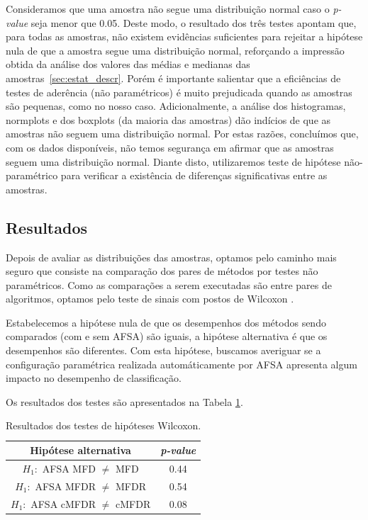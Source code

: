 \documentclass[conference]{IEEEtran}
\begin{document}
Consideramos que uma amostra não segue uma distribuição normal caso o \textit{p-value} seja menor que 0.05.
Deste modo, o resultado dos três testes apontam que, para todas as amostras, não existem evidências suficientes para rejeitar a hipótese nula de que a amostra segue uma distribuição normal, reforçando a impressão obtida da análise dos valores das médias e medianas das amostras~\ref{sec:estat_descr}.
Porém é importante salientar que a eficiências de testes de aderência (não paramétricos) é muito prejudicada quando as amostras são pequenas, como no nosso caso.
Adicionalmente, a análise dos histogramas, normplots e dos boxplots (da maioria das amostras) dão indícios de que as amostras não seguem uma distribuição normal.
Por estas razões, concluímos que, com os dados disponíveis, não temos segurança em afirmar que as amostras seguem uma distribuição normal.
Diante disto, utilizaremos teste de hipótese não-paramétrico para verificar a existência de diferenças significativas entre as amostras.

\subsection{Resultados}

Depois de avaliar as distribuições das amostras, optamos pelo caminho mais seguro que consiste na comparação dos pares de métodos por testes não paramétricos. 
Como as comparações a serem executadas são entre pares de algoritmos, optamos pelo teste de sinais com postos de Wilcoxon \cite{wilcoxon1945individual}.

Estabelecemos a hipótese nula de que os desempenhos dos métodos sendo comparados (com e sem AFSA) são iguais, a hipótese alternativa é que os desempenhos são diferentes. Com esta hipótese, buscamos averiguar se a configuração paramétrica realizada automáticamente por AFSA apresenta algum impacto no desempenho de classificação.

Os resultados dos testes são apresentados na Tabela 
\ref{tab:rank_sum}.

\begin{table}[h]
	\centering
	\caption{Resultados dos testes de hipóteses Wilcoxon.}
	\label{tab:rank_sum}
	\begin{tabular}{c|c}
		\hline
		Hipótese alternativa							& \textit{p-value}\\
		\hline
		$H_1:$ AFSA MFD $\neq$ MFD   			& 0.44    \\
		$H_1:$ AFSA MFDR  $\neq$ MFDR			& 0.54    \\
		$H_1:$ AFSA cMFDR $\neq$ cMFDR			& 0.08    \\
		\hline
	\end{tabular}
\end{table}
\end{document}
